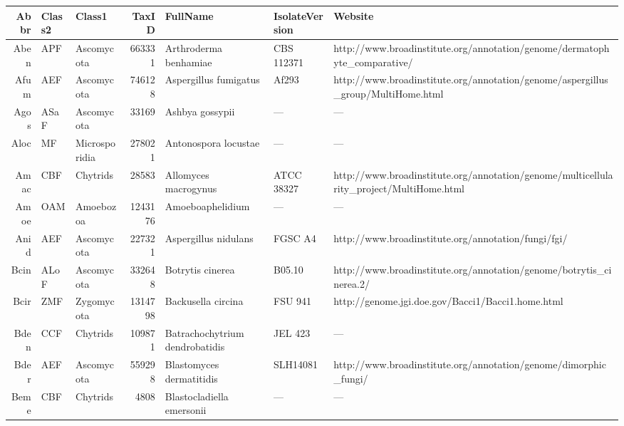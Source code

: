 
{\renewcommand{\arraystretch}{0.5}
\begin{table}[tbp]
\begin{tabular}{rllrlll}
\toprule
Abbr & Class2 & Class1 & TaxID & FullName & IsolateVersion & Website \\ 
\toprule
Aben & APF & Ascomycota & 663331 & Arthroderma benhamiae & CBS 112371 & http://www.broadinstitute.org/annotation/genome/dermatophyte\_comparative/ \\ 
  Afum & AEF & Ascomycota & 746128 & Aspergillus fumigatus & Af293 & http://www.broadinstitute.org/annotation/genome/aspergillus\_group/MultiHome.html \\ 
  Agos & ASaF & Ascomycota & 33169 & Ashbya gossypii & --- & --- \\ 
  Aloc & MF & Microsporidia & 278021 & Antonospora locustae & --- & --- \\ 
  Amac & CBF & Chytrids & 28583 & Allomyces macrogynus & ATCC 38327 & http://www.broadinstitute.org/annotation/genome/multicellularity\_project/MultiHome.html \\ 
  Amoe & OAM & Amoebozoa & 1243176 & Amoeboaphelidium & --- & --- \\ 
  Anid & AEF & Ascomycota & 227321 & Aspergillus nidulans & FGSC A4 & http://www.broadinstitute.org/annotation/fungi/fgi/ \\ 
  Bcin & ALoF & Ascomycota & 332648 & Botrytis cinerea & B05.10 & http://www.broadinstitute.org/annotation/genome/botrytis\_cinerea.2/ \\ 
  Bcir & ZMF & Zygomycota & 1314798 & Backusella circina & FSU 941 & http://genome.jgi.doe.gov/Bacci1/Bacci1.home.html \\ 
  Bden & CCF & Chytrids & 109871 & Batrachochytrium dendrobatidis & JEL 423 & --- \\ 
  Bder & AEF & Ascomycota & 559298 & Blastomyces dermatitidis & SLH14081 & http://www.broadinstitute.org/annotation/genome/dimorphic\_fungi/ \\ 
  Beme & CBF & Chytrids & 4808 & Blastocladiella emersonii & --- & --- \\ 

\end{tabular}
\end{table}}
